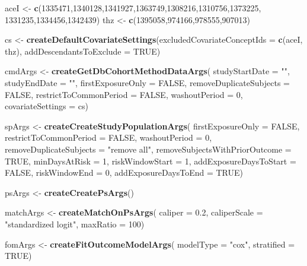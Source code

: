 \documentclass[11pt]{book}
\newenvironment{Shaded}{\begin{snugshade}}{\end{snugshade}}
\newcommand{\KeywordTok}[1]{\textcolor[rgb]{0.13,0.29,0.53}{\textbf{#1}}}
\newcommand{\DataTypeTok}[1]{\textcolor[rgb]{0.13,0.29,0.53}{#1}}
\newcommand{\DecValTok}[1]{\textcolor[rgb]{0.00,0.00,0.81}{#1}}
\newcommand{\FloatTok}[1]{\textcolor[rgb]{0.00,0.00,0.81}{#1}}
\newcommand{\StringTok}[1]{\textcolor[rgb]{0.31,0.60,0.02}{#1}}
\newcommand{\OtherTok}[1]{\textcolor[rgb]{0.56,0.35,0.01}{#1}}
\newcommand{\NormalTok}[1]{#1}
\begin{document}
\begin{Shaded}
\begin{Highlighting}[]
\NormalTok{aceI <-}\StringTok{ }\KeywordTok{c}\NormalTok{(}\DecValTok{1335471}\NormalTok{,}\DecValTok{1340128}\NormalTok{,}\DecValTok{1341927}\NormalTok{,}\DecValTok{1363749}\NormalTok{,}\DecValTok{1308216}\NormalTok{,}\DecValTok{1310756}\NormalTok{,}\DecValTok{1373225}\NormalTok{,}
          \DecValTok{1331235}\NormalTok{,}\DecValTok{1334456}\NormalTok{,}\DecValTok{1342439}\NormalTok{)}
\NormalTok{thz <-}\StringTok{ }\KeywordTok{c}\NormalTok{(}\DecValTok{1395058}\NormalTok{,}\DecValTok{974166}\NormalTok{,}\DecValTok{978555}\NormalTok{,}\DecValTok{907013}\NormalTok{)}

\NormalTok{cs <-}\StringTok{ }\KeywordTok{createDefaultCovariateSettings}\NormalTok{(}\DataTypeTok{excludedCovariateConceptIds =} \KeywordTok{c}\NormalTok{(aceI, }
\NormalTok{                                                                     thz),}
                                     \DataTypeTok{addDescendantsToExclude =} \OtherTok{TRUE}\NormalTok{)}

\NormalTok{cmdArgs <-}\StringTok{ }\KeywordTok{createGetDbCohortMethodDataArgs}\NormalTok{(}
  \DataTypeTok{studyStartDate =} \StringTok{""}\NormalTok{,}
  \DataTypeTok{studyEndDate =} \StringTok{""}\NormalTok{,}
  \DataTypeTok{firstExposureOnly =} \OtherTok{FALSE}\NormalTok{,}
  \DataTypeTok{removeDuplicateSubjects =} \OtherTok{FALSE}\NormalTok{,}
  \DataTypeTok{restrictToCommonPeriod =} \OtherTok{FALSE}\NormalTok{,}
  \DataTypeTok{washoutPeriod =} \DecValTok{0}\NormalTok{,}
  \DataTypeTok{covariateSettings =}\NormalTok{ cs)}

\NormalTok{spArgs <-}\StringTok{ }\KeywordTok{createCreateStudyPopulationArgs}\NormalTok{(}
  \DataTypeTok{firstExposureOnly =} \OtherTok{FALSE}\NormalTok{,}
  \DataTypeTok{restrictToCommonPeriod =} \OtherTok{FALSE}\NormalTok{,}
  \DataTypeTok{washoutPeriod =} \DecValTok{0}\NormalTok{,}
  \DataTypeTok{removeDuplicateSubjects =} \StringTok{"remove all"}\NormalTok{,}
  \DataTypeTok{removeSubjectsWithPriorOutcome =} \OtherTok{TRUE}\NormalTok{,}
  \DataTypeTok{minDaysAtRisk =} \DecValTok{1}\NormalTok{,}
  \DataTypeTok{riskWindowStart =} \DecValTok{1}\NormalTok{,}
  \DataTypeTok{addExposureDaysToStart =} \OtherTok{FALSE}\NormalTok{,}
  \DataTypeTok{riskWindowEnd =} \DecValTok{0}\NormalTok{,}
  \DataTypeTok{addExposureDaysToEnd =} \OtherTok{TRUE}\NormalTok{)}

\NormalTok{psArgs <-}\StringTok{ }\KeywordTok{createCreatePsArgs}\NormalTok{()}

\NormalTok{matchArgs <-}\StringTok{ }\KeywordTok{createMatchOnPsArgs}\NormalTok{(}
  \DataTypeTok{caliper =} \FloatTok{0.2}\NormalTok{, }
  \DataTypeTok{caliperScale =} \StringTok{"standardized logit"}\NormalTok{, }
  \DataTypeTok{maxRatio =} \DecValTok{100}\NormalTok{)}

\NormalTok{fomArgs <-}\StringTok{ }\KeywordTok{createFitOutcomeModelArgs}\NormalTok{(}
  \DataTypeTok{modelType =} \StringTok{"cox"}\NormalTok{,}
  \DataTypeTok{stratified =} \OtherTok{TRUE}\NormalTok{)}
\end{Highlighting}
\end{Shaded}
\end{document}
